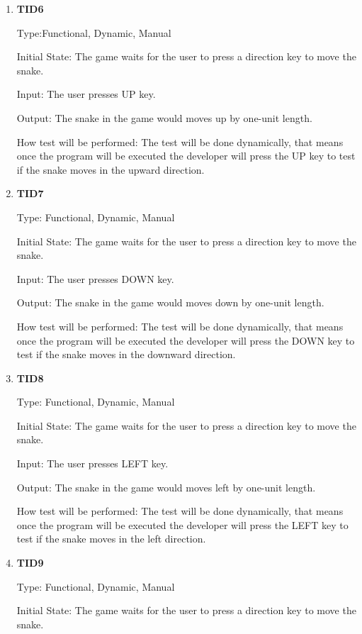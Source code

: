 \documentclass[12pt, titlepage]{article}
\begin{document}
\begin{enumerate}
\item{\textbf{TID6}\\}

Type:Functional, Dynamic, Manual 	
					
Initial State: The game waits for the user to press a direction key to move the snake.
					
Input: The user presses UP key.
					
Output: The snake in the game would moves up by one-unit length.
					
How test will be performed: The test will be done dynamically, that means once the program will be executed the developer will press the UP key to test if the snake moves in the upward direction.

\item{\textbf{TID7}\\}

Type: Functional, Dynamic, Manual 	
					
Initial State: The game waits for the user to press a direction key to move the snake.
					
Input: The user presses DOWN key.
					
Output: The snake in the game would moves down by one-unit length.
					
How test will be performed: The test will be done dynamically, that means once the program will be executed the developer will press the DOWN key to test if the snake moves in the downward direction.


\item{\textbf{TID8}\\}

Type: Functional, Dynamic, Manual 	
					
Initial State: The game waits for the user to press a direction key to move the snake.
					
Input: The user presses LEFT key.
					
Output: The snake in the game would moves left by one-unit length.
					
How test will be performed: The test will be done dynamically, that means once the program will be executed the developer will press the LEFT key to test if the snake moves in the left direction.

\item{\textbf{TID9}\\}

Type: Functional, Dynamic, Manual 	
					
Initial State: The game waits for the user to press a direction key to move the snake.
					

\end{enumerate}
\end{document}
